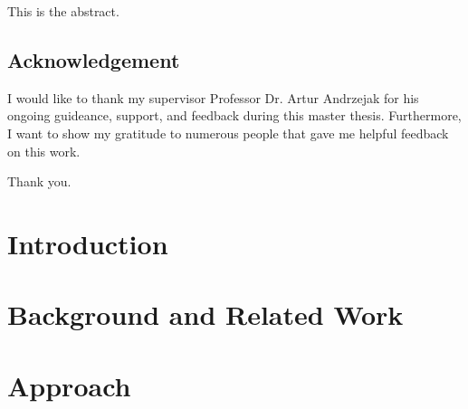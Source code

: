 \documentclass[
     12pt,                    %
     a4paper,             %
     BCOR10mm,     %
     DIV14,                 %
     listof=totoc,                    %
     bibliography=totoc,       %
     index=totoc,              %
     twoside,
     headsepline
     ]{scrreprt}
\begin{document}
This is the abstract.


\newpage
\section*{Acknowledgement}
I would like to thank my supervisor Professor Dr. Artur Andrzejak for his ongoing guideance, support, and feedback during this master thesis.
Furthermore, I want to show my gratitude to numerous people that gave me helpful feedback on this work.

Thank you.


\cleardoublepage

\tableofcontents
\cleardoublepage
{} 

\listoffigures
\listoftables
\cleardoublepage


\chapter{Introduction}\label{chap:intro}





\chapter{Background and Related Work}\label{chap:background}



\chapter{Approach}\label{chap:approach}


\end{document}
